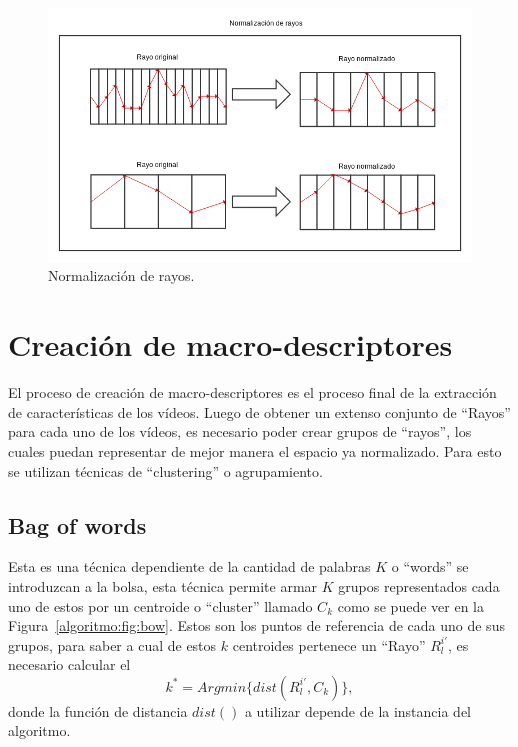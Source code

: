 	\begin{figure}[!]
		\centering
  		\label{algoritmo:fig:normalizacion}
    		\includegraphics[width=1\textwidth]{Figuras/Diagramas/normalizacion_de_rayos.png}
  		\caption{Normalización de rayos.}
	\end{figure}	

	
\newpage	
\section{Creación de macro-descriptores}
\label{sec:macro-descriptores}
El proceso de creación de macro-descriptores es el proceso final de la extracción de características de los vídeos. Luego de obtener un extenso conjunto de ``Rayos'' para cada uno de los vídeos, es necesario poder crear grupos de ``rayos'', los cuales puedan representar de mejor manera el espacio ya normalizado. Para esto se utilizan técnicas de ``clustering'' o agrupamiento.
	\subsection{Bag of words}
	\label{algoritmo:bow}
		Esta es una técnica dependiente de la cantidad de palabras $K$ o ``words'' se introduzcan a la bolsa, esta técnica permite armar $K$ grupos representados cada uno de estos por un centroide o ``cluster'' llamado $C_k$ como se puede ver en la Figura~\ref{algoritmo:fig:bow}. Estos son los puntos de referencia de cada uno de sus grupos, para saber a cual de estos $k$ centroides pertenece un ``Rayo'' $R^{i'}_l$, es necesario calcular el
		\begin{equation}
  			\label{algoritmo:eq:dist}
			k^* = Argmin\{dist(R^{i'}_l,C_k)\},
		\end{equation}
		donde la función de distancia $dist()$ a utilizar depende de la instancia del algoritmo.

